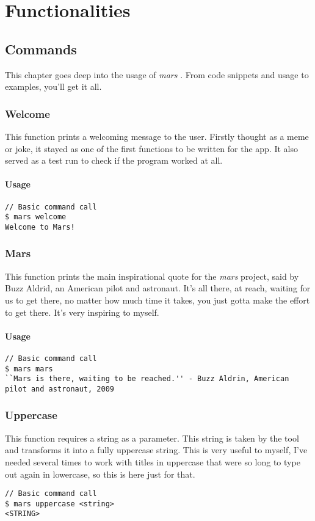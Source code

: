 \documentclass{report}
\begin{document}
\chapter{Functionalities}
\section{Commands}
This chapter goes deep into the usage of \emph{mars} \cite{fernandezMariolfhMars2025}.  From code snippets and usage to examples, you'll get it all. 

\subsection{Welcome}
This function prints a welcoming message to the user. Firstly thought as a meme or joke, it stayed as one of the first functions to be written for the app. It also served as a test run to check if the program worked at all.
\subsubsection{Usage}
\begin{lstlisting}
// Basic command call
$ mars welcome
Welcome to Mars!
\end{lstlisting}

\subsection{Mars}
This function prints the main inspirational quote for the \emph{mars} project, said by Buzz Aldrid, an American pilot and astronaut. It's all there, at reach, waiting for us to get there, no matter how much time it takes, you just gotta make the effort to get there. It's very inspiring to myself.
\subsubsection{Usage}
\begin{lstlisting}
// Basic command call
$ mars mars
``Mars is there, waiting to be reached.'' - Buzz Aldrin, American pilot and astronaut, 2009
\end{lstlisting}

\subsection{Uppercase}
This function requires a string as a parameter. This string is taken by the tool and transforms it into a fully uppercase string. This is very useful to myself, I've needed several times to work with titles in uppercase that were so long to type out again in lowercase, so this is here just for that.
\begin{lstlisting}
// Basic command call
$ mars uppercase <string>
<STRING>
\end{lstlisting}
\end{document}
